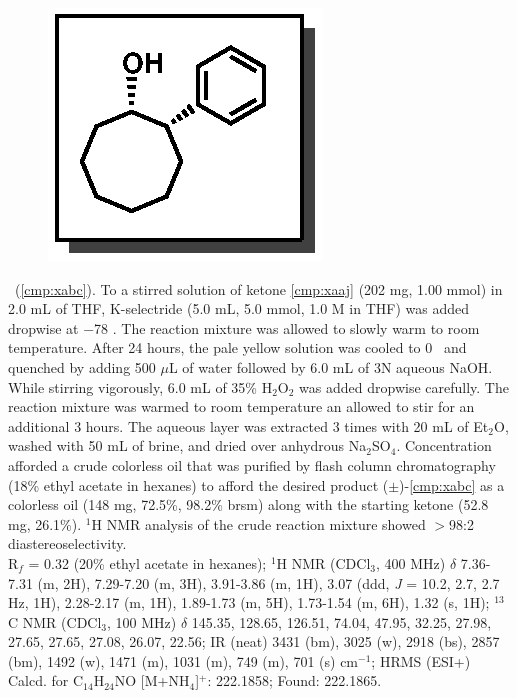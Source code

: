 \vspace{10pt}
\begin{figure}
  \vspace{-20pt}
  \begin{center}
    \includegraphics[scale=0.8]{chp_asymmetric/images/xaba}
  \end{center}
  \vspace{-25pt}
\end{figure}\noindent \textbf{\CMPxaba}\ (\ref{cmp:xabc}). To a stirred solution of ketone
\ref{cmp:xaaj} (202 mg, 1.00 mmol) in 2.0 mL of THF, K-selectride (5.0 mL, 5.0 mmol, 1.0 M in THF)
was added dropwise at $-$78 \degc.
The reaction mixture was allowed to slowly warm to room temperature. After 24 hours, the pale yellow
solution was cooled to 0 \degc\ and quenched by adding 500 $\mu$L of water followed by 6.0 mL of 3N
aqueous NaOH. While stirring vigorously, 6.0 mL of 35\% H$_2$O$_2$  was added dropwise carefully.
The reaction mixture was warmed to room temperature an allowed to stir for an additional 3 hours.
The aqueous layer was extracted 3 times with 20 mL of Et$_2$O, washed with 50 mL of brine, and dried
over anhydrous Na$_2$SO$_4$. Concentration afforded a crude colorless oil that was purified by flash
column chromatography (18\% ethyl acetate in hexanes) to afford the desired product
($\pm$)-\ref{cmp:xabc} as a colorless oil (148 mg, 72.5\%, 98.2\% brsm) along with the starting
ketone (52.8 mg, 26.1\%). $^1$H NMR analysis of the crude reaction mixture showed $>$98:2 diastereoselectivity.\\
R$_f$ = 0.32 (20\% ethyl acetate in hexanes); $^1$H NMR (CDCl$_3$, 400 MHz) $\delta$ 7.36-7.31 (m,
2H), 7.29-7.20 (m, 3H), 3.91-3.86 (m, 1H), 3.07 (ddd, \textit{J} = 10.2, 2.7, 2.7 Hz, 1H), 2.28-2.17
(m, 1H), 1.89-1.73 (m, 5H), 1.73-1.54 (m, 6H), 1.32 (s, 1H); $^{13}$C NMR (CDCl$_3$, 100 MHz)
$\delta$ 145.35, 128.65, 126.51, 74.04, 47.95, 32.25, 27.98, 27.65, 27.65, 27.08, 26.07, 22.56; IR
(neat) 3431 (bm), 3025 (w), 2918 (bs), 2857 (bm), 1492 (w), 1471 (m), 1031 (m), 749 (m), 701 (s)
cm$^{-1}$; HRMS (ESI+) Calcd. for C$_{14}$H$_{24}$NO [M+NH$_4$]$^+$: 222.1858; Found: 222.1865.

